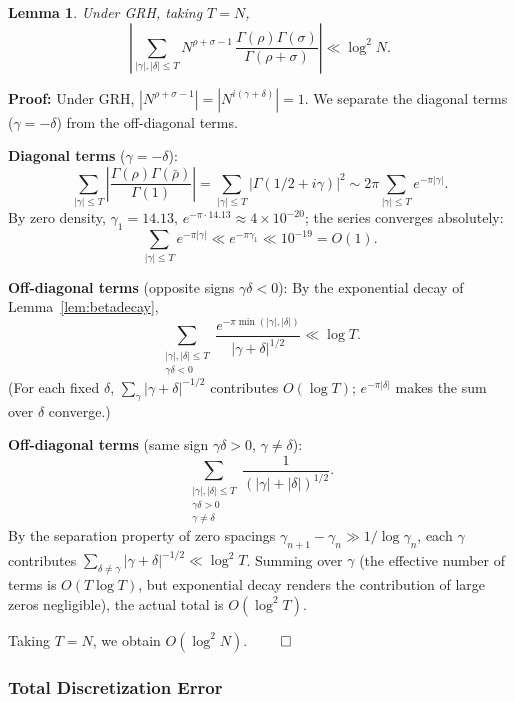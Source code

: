 \documentclass[11pt,a4paper]{article}
\newtheorem{lemma}[theorem]{Lemma}
\theoremstyle{remark}
\begin{document}
\begin{lemma}\label{lem:betasum}
Under GRH, taking $T = N$,
\begin{equation}\label{eq:betasumbound}
\left|\sum_{|\gamma|,|\delta| \leq T} N^{\rho+\sigma-1}\, \frac{\Gamma(\rho)\Gamma(\sigma)}{\Gamma(\rho+\sigma)}\right| \ll \log^2 N.
\end{equation}
\end{lemma}

\noindent\textbf{Proof:} Under GRH, $|N^{\rho+\sigma-1}| = |N^{i(\gamma+\delta)}| = 1$. We separate the diagonal terms ($\gamma = -\delta$) from the off-diagonal terms.

\noindent\textbf{Diagonal terms} ($\gamma = -\delta$):
\[
\sum_{|\gamma| \leq T} \left|\frac{\Gamma(\rho)\Gamma(\bar\rho)}{\Gamma(1)}\right| = \sum_{|\gamma| \leq T} |\Gamma(1/2+i\gamma)|^2 \sim 2\pi \sum_{|\gamma| \leq T} e^{-\pi|\gamma|}.
\]
By zero density, $\gamma_1 = 14.13$, $e^{-\pi\cdot 14.13} \approx 4 \times 10^{-20}$; the series converges absolutely:
\[
\sum_{|\gamma| \leq T} e^{-\pi|\gamma|} \ll e^{-\pi\gamma_1} \ll 10^{-19} = O(1).
\]

\noindent\textbf{Off-diagonal terms} (opposite signs $\gamma\delta < 0$): By the exponential decay of Lemma~\ref{lem:betadecay},
\[
\sum_{\substack{|\gamma|,|\delta| \leq T \\ \gamma\delta < 0}} \frac{e^{-\pi\min(|\gamma|,|\delta|)}}{|\gamma+\delta|^{1/2}} \ll \log T.
\]
(For each fixed $\delta$, $\sum_\gamma |\gamma+\delta|^{-1/2}$ contributes $O(\log T)$; $e^{-\pi|\delta|}$ makes the sum over $\delta$ converge.)

\noindent\textbf{Off-diagonal terms} (same sign $\gamma\delta > 0$, $\gamma \neq \delta$):
\[
\sum_{\substack{|\gamma|,|\delta| \leq T \\ \gamma\delta > 0 \\ \gamma \neq \delta}} \frac{1}{(|\gamma|+|\delta|)^{1/2}}.
\]
By the separation property of zero spacings $\gamma_{n+1} - \gamma_n \gg 1/\log\gamma_n$, each $\gamma$ contributes $\sum_{\delta \neq \gamma} |\gamma+\delta|^{-1/2} \ll \log^2 T$. Summing over $\gamma$ (the effective number of terms is $O(T\log T)$, but exponential decay renders the contribution of large zeros negligible), the actual total is $O(\log^2 T)$.

Taking $T = N$, we obtain $O(\log^2 N)$. $\qed$

\subsubsection{Total Discretization Error}
\end{document}
